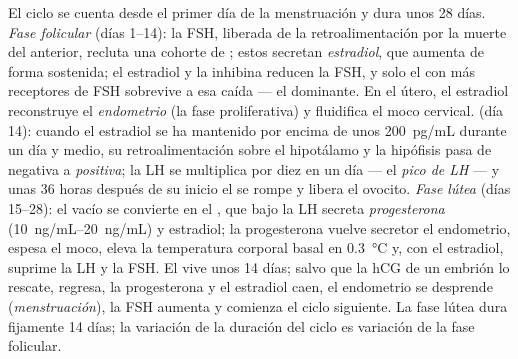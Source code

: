 \begin{definition}\label{def:b2:reproductive-hormones:cycle}
El ciclo se cuenta desde el primer día de la menstruación y dura unos 28
días. \emph{Fase folicular} (días 1--14): la FSH, liberada de la
retroalimentación por la muerte del  anterior, recluta una
cohorte de ; estos secretan \emph{estradiol}, que aumenta de
forma sostenida; el estradiol y la inhibina reducen la FSH, y solo el
 con más receptores de FSH sobrevive a esa caída --- el 
dominante. En el útero, el estradiol reconstruye el \emph{endometrio} (la
fase proliferativa) y fluidifica el moco cervical. \emph{}
(día 14): cuando el estradiol se ha mantenido por encima de unos
\qty{200}{pg/mL} durante un día y medio, su retroalimentación sobre el
hipotálamo y la hipófisis pasa de negativa a \emph{positiva}; la LH se
multiplica por diez en un día --- el \emph{pico de LH} --- y unas 36 horas
después de su inicio el  se rompe y libera el ovocito. \emph{Fase
lútea} (días 15--28): el  vacío se convierte en el ,
que bajo la LH secreta \emph{progesterona} (\qtyrange{10}{20}{ng/mL}) y
estradiol; la progesterona vuelve secretor el endometrio, espesa el moco,
eleva la temperatura corporal basal en \qty{0.3}{\celsius} y, con el
estradiol, suprime la LH y la FSH. El  vive unos 14 días;
salvo que la hCG de un embrión lo rescate, regresa, la progesterona y el
estradiol caen, el endometrio se desprende (\emph{menstruación}), la FSH
aumenta y comienza el ciclo siguiente. La fase lútea dura fijamente 14
días; la variación de la duración del ciclo es variación de la fase
folicular.
\end{definition}

